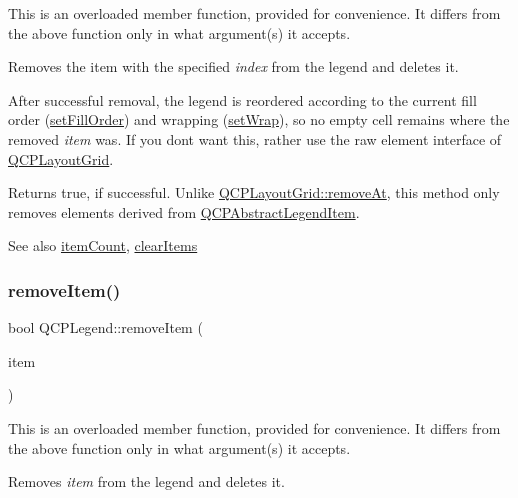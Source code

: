 This is an overloaded member function, provided for convenience. It differs from the above function only in what argument(s) it accepts.

Removes the item with the specified {\itshape index} from the legend and deletes it.

After successful removal, the legend is reordered according to the current fill order (\hyperlink{class_q_c_p_layout_grid_affc2f3cfd22f28698c5b29b960d2a391}{set\+Fill\+Order}) and wrapping (\hyperlink{class_q_c_p_layout_grid_ab36af18d77e4428386d02970382ee598}{set\+Wrap}), so no empty cell remains where the removed {\itshape item} was. If you don\textquotesingle{}t want this, rather use the raw element interface of \hyperlink{class_q_c_p_layout_grid}{Q\+C\+P\+Layout\+Grid}.

Returns true, if successful. Unlike \hyperlink{class_q_c_p_layout_a2403f684fee3ce47132faaeed00bb066}{Q\+C\+P\+Layout\+Grid\+::remove\+At}, this method only removes elements derived from \hyperlink{class_q_c_p_abstract_legend_item}{Q\+C\+P\+Abstract\+Legend\+Item}.

\begin{DoxySeeAlso}{See also}
\hyperlink{class_q_c_p_legend_a57ab86ab8b2a3762d4c1455eb5452c88}{item\+Count}, \hyperlink{class_q_c_p_legend_a24795c7250eb5214fcea16b7217b4dfb}{clear\+Items} 
\end{DoxySeeAlso}
\mbox{\label{class_q_c_p_legend_a2aea4ec6da2d454dd0b241a254d65082}} 
\subsubsection{\texorpdfstring{remove\+Item()}{removeItem()}\hspace{0.1cm}{\footnotesize\ttfamily [2/2]}}
{\footnotesize\ttfamily bool Q\+C\+P\+Legend\+::remove\+Item (\begin{DoxyParamCaption}\item[{\hyperlink{class_q_c_p_abstract_legend_item}{Q\+C\+P\+Abstract\+Legend\+Item} $\ast$}]{item }\end{DoxyParamCaption})}

This is an overloaded member function, provided for convenience. It differs from the above function only in what argument(s) it accepts.

Removes {\itshape item} from the legend and deletes it.

